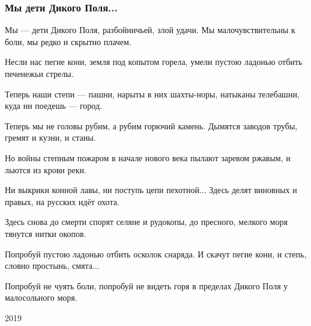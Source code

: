  
 
 

\subsubsection{Мы дети Дикого Поля...}

Мы — дети Дикого Поля,
разбойничьей, злой удачи.
Мы малочувствительны к боли,
мы редко и скрытно плачем.

Несли нас пегие кони,
земля под копытом горела,
умели пустою ладонью
отбить печенежьи стрелы.

Теперь наши степи — пашни,
нарыты в них шахты-норы,
натыканы телебашни,
куда ни поедешь — город.

Теперь мы не головы рубим,
а рубим горючий камень.
Дымятся заводов трубы,
гремят и кузни, и станы.

Но войны степным пожаром
в начале нового века
пылают заревом ржавым,
и льются из крови реки.

Ни выкрики конной лавы,
ни поступь цепи пехотной...
Здесь делят виновных и правых,
на русских идёт охота.

Здесь снова до смерти спорят
селяне и рудокопы,
до пресного, мелкого моря
тянутся нитки окопов.

Попробуй пустою ладонью
отбить осколок снаряда.
И скачут пегие кони,
и степь, словно простынь, смята...

Попробуй не чуять боли,
попробуй не видеть горя
в пределах Дикого Поля
у малосольного моря.

2019
